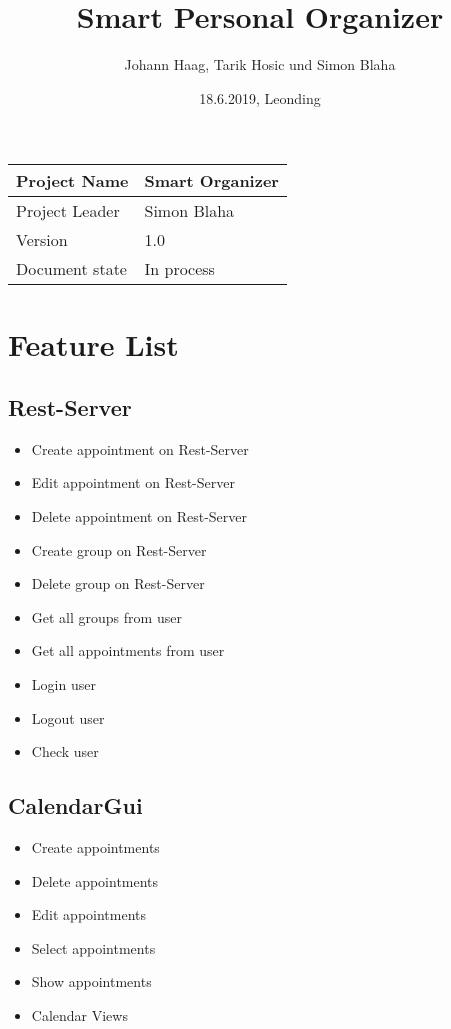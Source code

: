 \documentclass[12pt]{scrartcl}
\title{Smart Personal Organizer}
\author{Johann Haag, Tarik Hosic und Simon Blaha}
\date{18.6.2019, Leonding}
\begin{document}
    \maketitle
    \begin{flushleft}
    \begin{tabular}{|l|l|}
    \hline
    Project Name & Smart Organizer \\ \hline
    Project Leader & Simon Blaha \\ \hline
    Version & 1.0\\ \hline
    Document state & In process \\ \hline
    \end{tabular}
    \end{flushleft}

    \pagebreak
    \tableofcontents
    \pagebreak

    \section{Feature List}
    \subsection{Rest-Server}
    \begin{itemize}
        \item Create appointment on Rest-Server
        \item Edit appointment on Rest-Server
        \item Delete appointment on Rest-Server
        \item Create group on Rest-Server
        \item Delete group on Rest-Server
        \item Get all groups from user
        \item Get all appointments from user
        \item Login user 
        \item Logout user 
        \item Check user
    \end{itemize}
    \subsection{CalendarGui}
    \begin{itemize}
        \item Create appointments
        \item Delete appointments
        \item Edit appointments
        \item Select appointments
        \item Show appointments
        \item Calendar Views
    \end{itemize}
\end{document}
